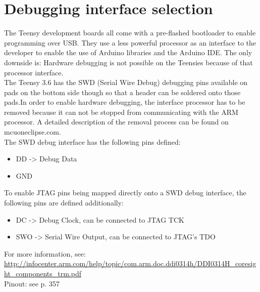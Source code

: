 \section*{Debugging interface selection}
The Teensy development boards all come with a pre-flashed bootloader to enable programming over USB. They use a less powerful processor as an interface to the developer to enable the use of Arduino libraries and the Arduino IDE. The only downside is: Hardware debugging is not possible on the Teensies because of that processor interface.\\
The Teensy 3.6 has the SWD (Serial Wire Debug) debugging pins available on pads on the bottom side though so that a header can be soldered onto those pads.In order to enable hardware debugging, the interface processor has to be removed because it can not be stopped from communicating with the ARM processor. A detailed description of the removal process can be found on mcuoneclipse.com.\\
The SWD debug interface has the following pins defined:
\begin{itemize}
	\item DD -> Debug Data \\
	\item GND \\
\end{itemize}
To enable JTAG pins being mapped directly onto a SWD debug interface, the following pins are defined additionally:
\begin{itemize}
	\item DC -> Debug Clock, can be connected to JTAG TCK \\
	\item SWO -> Serial Wire Output, can be connected to JTAG's TDO \\
\end{itemize}
For more information, see: \\\url{http://infocenter.arm.com/help/topic/com.arm.doc.ddi0314h/DDI0314H_coresight_components_trm.pdf} \\
Pinout: see p. 357\\
